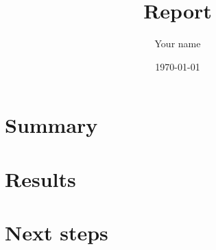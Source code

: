 \documentclass[11pt]{article}
\title{Report}
\author{Your name}
\date{\today}
\begin{document}
\titleblock

\section{Summary}

\section{Results}

\section{Next steps}
\end{document}
